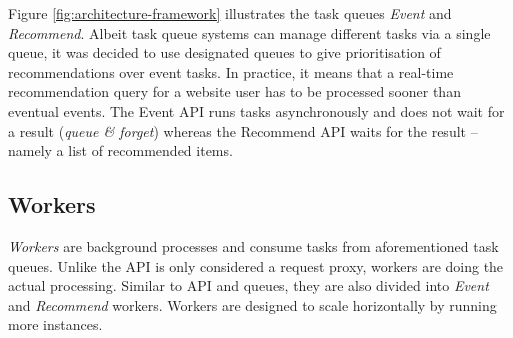 Figure \ref{fig:architecture-framework} illustrates the task queues \emph{Event} and \emph{Recommend}. Albeit task queue systems can manage different tasks via a single queue, it was decided to use designated queues to give prioritisation of recommendations over event tasks. In practice, it means that a real-time recommendation query for a website user has to be processed sooner than eventual events. The Event API runs tasks asynchronously and does not wait for a result (\emph{queue \& forget}) whereas the Recommend API waits for the result -- namely a list of recommended items.

\subsection{Workers}

\emph{Workers} are background processes and consume tasks from aforementioned task queues. Unlike the API is only considered a request proxy, workers are doing the actual processing. Similar to API and queues, they are also divided into \emph{Event} and \emph{Recommend} workers. Workers are designed to scale horizontally by running more instances.